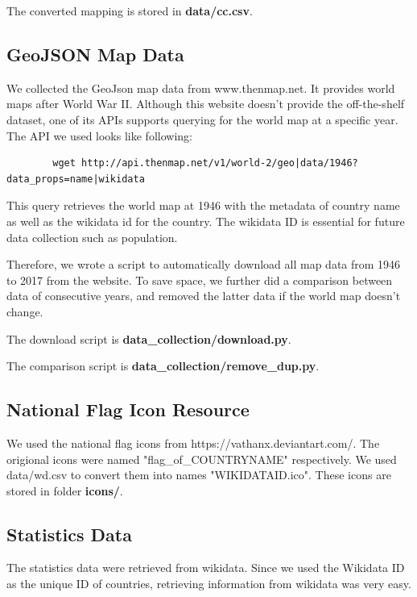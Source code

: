 \documentclass[12pt, fullpage,letterpaper]{article}
\begin{document}
        The converted mapping is stored in \textbf{data/cc.csv}.

\subsection{GeoJSON Map Data}
    We collected the GeoJson map data from www.thenmap.net.
    It provides world maps after World War II.
        Although this website doesn't provide the off-the-shelf dataset, one of its
        APIs supports querying for the world map at a specific year. The API
        we used looks like following:

        \begin{verbatim}
        wget http://api.thenmap.net/v1/world-2/geo|data/1946?data_props=name|wikidata
        \end{verbatim}

        This query retrieves the world map at 1946 with the metadata of country name as well as
        the wikidata id for the country. The wikidata ID is essential for future data collection
        such as population.

        Therefore, we wrote a script to automatically download all map data
        from 1946 to 2017 from the website.  To save space, we further did a
        comparison between data of consecutive years, and removed the latter
        data if the world map doesn't change.

        The download script is \textbf{data\_collection/download.py}.
        
        The comparison script is \textbf{data\_collection/remove\_dup.py}.

\subsection{National Flag Icon Resource}

    We used the national flag icons from https://vathanx.deviantart.com/.
    The origional icons were named "flag\_of\_COUNTRYNAME" respectively. We used data/wd.csv
    to convert them into names "WIKIDATAID.ico". These icons are stored in folder \textbf{icons/}.


\subsection{Statistics Data}
    The statistics data were retrieved from wikidata. Since we used the Wikidata ID as the unique ID of countries,
    retrieving information from wikidata was very easy.
\end{document}

